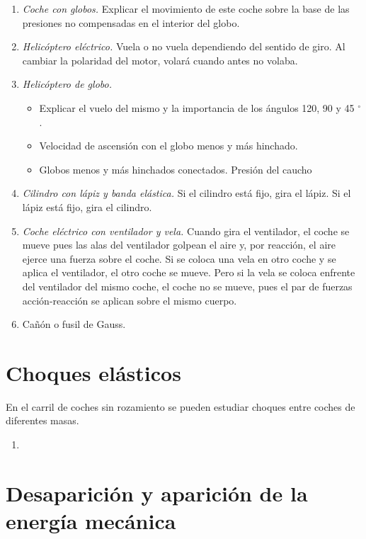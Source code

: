 \documentclass[11pt]{articulo}
\begin{document}
\begin{enumerate}
\item {\it Coche con globos.} Explicar el movimiento de este coche sobre la base de las presiones no compensadas en el interior del globo. 
\item {\it Helic\'optero el\'ectrico.} Vuela o no vuela dependiendo del sentido de giro. Al cambiar la polaridad del motor, volar\'a cuando antes no volaba. 
\item {\it Helic\'optero de globo.} 
  \begin{itemize}
  \item Explicar el vuelo del mismo y la importancia de los \'angulos 120, 90 y 45 $^\circ$.
  \item Velocidad de ascensi\'on con el globo menos y m\'as hinchado.
  \item Globos menos y m\'as hinchados conectados. Presi\'on del caucho
  \end{itemize}
\item {\it Cilindro con l\'apiz y banda el\'astica.} Si el cilindro est\'a fijo, gira el l\'apiz. Si el l\'apiz est\'a fijo, gira el cilindro. 
\item {\it Coche el\'ectrico con ventilador y vela.} Cuando gira el ventilador, el coche se mueve pues las alas del ventilador golpean el aire y, por reacci\'on, el aire ejerce una fuerza sobre el coche. Si se coloca una vela en otro coche y se aplica el ventilador, el otro coche se mueve. Pero si la vela se coloca enfrente del ventilador del mismo coche, el coche no se mueve, pues el par de fuerzas acci\'on-reacci\'on se aplican sobre el mismo cuerpo.
\item Ca\~n\'on o fusil de Gauss.
\end{enumerate}

\section{Choques el\'asticos}

En el carril de coches sin rozamiento se pueden estudiar choques entre coches de diferentes masas.
\begin{enumerate}
\item
\end{enumerate}


\section{Desaparici\'on y aparici\'on de la energ\'ia mec\'anica}
\end{document}
